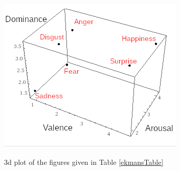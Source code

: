 \begin{figure}[ht]
\centering
\includegraphics[scale=2]{litImgs/Ekmans3d.png}
\label{ekmans:graph}
\caption{3d plot of the figures given in Table \ref{ekmansTable}}
\end{figure}

